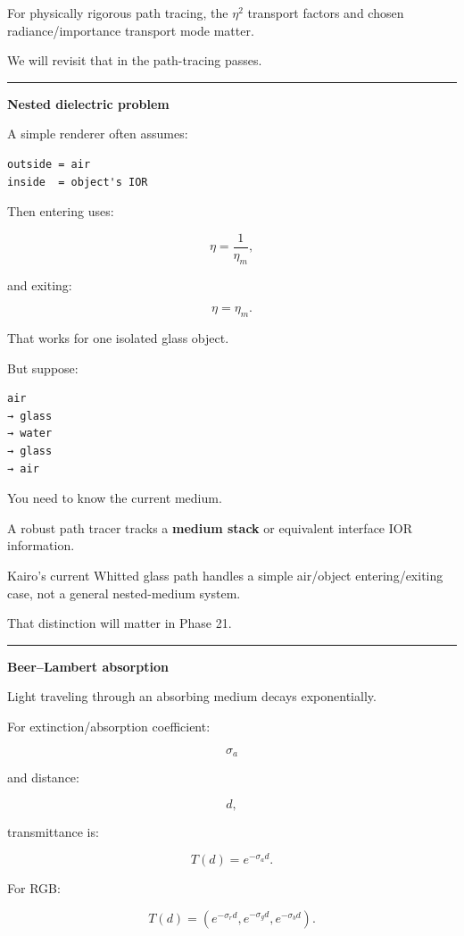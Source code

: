 For physically rigorous path tracing, the \(\eta^2\) transport factors and chosen radiance/importance transport mode matter.

We will revisit that in the path-tracing passes.

\begin{center}\rule{0.5\linewidth}{0.5pt}\end{center}

\textbf{Nested dielectric problem}

A simple renderer often assumes:

\begin{verbatim}
outside = air
inside  = object's IOR
\end{verbatim}

Then entering uses:

\[
\eta=
\frac1{\eta_m},
\]

and exiting:

\[
\eta=
\eta_m.
\]

That works for one isolated glass object.

But suppose:

\begin{verbatim}
air
→ glass
→ water
→ glass
→ air
\end{verbatim}

You need to know the current medium.

A robust path tracer tracks a \textbf{medium stack} or equivalent interface IOR information.

Kairo's current Whitted glass path handles a simple air/object entering/exiting case, not a general nested-medium system.

That distinction will matter in Phase 21.

\begin{center}\rule{0.5\linewidth}{0.5pt}\end{center}

\textbf{Beer--Lambert absorption}

Light traveling through an absorbing medium decays exponentially.

For extinction/absorption coefficient:

\[
\sigma_a
\]

and distance:

\[
d,
\]

transmittance is:

\[
\boxed{
T(d)=e^{-\sigma_a d}.
}
\]

For RGB:

\[
\boxed{
T(d)
=
\left(
e^{-\sigma_r d},
e^{-\sigma_g d},
e^{-\sigma_b d}
\right).
}
\]

